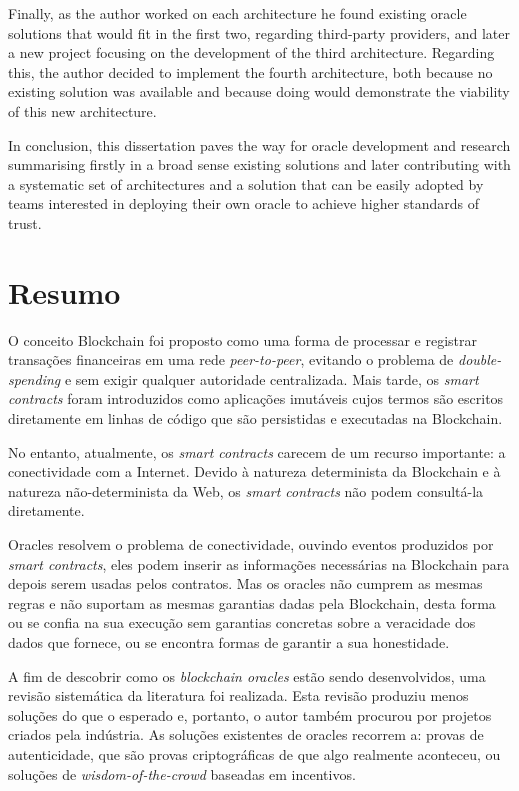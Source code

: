 Finally, as the author worked on each architecture he found existing oracle solutions that would fit in the first two, regarding third-party providers, and later a new project focusing on the development of the third architecture. Regarding this, the author decided to implement the fourth architecture, both because no existing solution was available and because doing would demonstrate the viability of this new architecture.

In conclusion, this dissertation paves the way for oracle development and research summarising firstly in a broad sense existing solutions and later contributing with a systematic set of architectures and a solution that can be easily adopted by teams interested in deploying their own oracle to achieve higher standards of trust.


\chapter*{Resumo}


O conceito Blockchain foi proposto como uma forma de processar e registrar transações financeiras em uma rede \textit{peer-to-peer}, evitando o problema de \textit{double-spending} e sem exigir qualquer autoridade centralizada. Mais tarde, os \textit{smart contracts} foram introduzidos como aplicações imutáveis ​​cujos termos são escritos diretamente em linhas de código que são persistidas e executadas na Blockchain.


No entanto, atualmente, os \textit{smart contracts} carecem de um recurso importante: a conectividade com a Internet. Devido à natureza determinista da Blockchain e à natureza não-determinista da Web, os \textit{smart contracts} não podem consultá-la diretamente.

Oracles resolvem o problema de conectividade, ouvindo eventos produzidos por \textit{smart contracts}, eles podem inserir as informações necessárias na Blockchain para depois serem usadas pelos contratos. Mas os oracles não cumprem as mesmas regras e não suportam as mesmas garantias dadas pela Blockchain, desta forma ou se confia na sua execução sem garantias concretas sobre a veracidade dos dados que fornece, ou se encontra formas de garantir a sua honestidade.

A fim de descobrir como os \textit{blockchain oracles} estão sendo desenvolvidos, uma revisão sistemática da literatura foi realizada. Esta revisão produziu menos soluções do que o esperado e, portanto, o autor também procurou por projetos criados pela indústria. As soluções existentes de oracles recorrem a: provas de autenticidade, que são provas criptográficas de que algo realmente aconteceu, ou soluções de \textit{wisdom-of-the-crowd} baseadas em incentivos.

